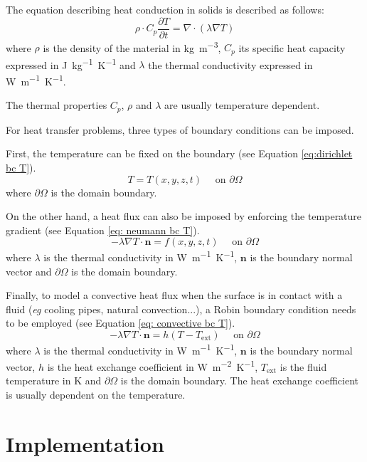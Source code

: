 The equation describing heat conduction in solids is described as follows:
\begin{equation}
    \rho \cdot C_p \frac{\partial T}{\partial t}=\nabla \cdot (\lambda \nabla T)
    \label{eq:heat equation}
\end{equation}
where $\rho$ is the density of the material in \si{kg.m^{-3}}, $C_p$ its specific heat capacity expressed in \si{J.kg^{-1}.K^{-1}} and $\lambda$ the thermal conductivity expressed in \si{W.m^{-1}.K^{-1}}.

The thermal properties $C_p$, $\rho$ and $\lambda$ are usually temperature dependent.

For heat transfer problems, three types of boundary conditions can be imposed.

First, the temperature can be fixed on the boundary (see Equation \ref{eq:dirichlet bc T}).
\begin{equation}
    T = T(x, y, z, t) \quad \text { on } \partial \Omega
    \label{eq:dirichlet bc T}
\end{equation}
where $\partial \Omega$ is the domain boundary.

On the other hand, a heat flux can also be imposed by enforcing the temperature gradient (see Equation \ref{eq: neumann bc T}).
\begin{equation}
    -\lambda \nabla T \cdot \mathbf{n} = f(x, y, z, t) \quad \text { on } \partial \Omega
    \label{eq: neumann bc T}
\end{equation}
where $\lambda$ is the thermal conductivity in \si{W.m^{-1}.K^{-1}}, $\mathbf{n}$ is the boundary normal vector and $\partial \Omega$ is the domain boundary.

Finally, to model a convective heat flux when the surface is in contact with a fluid (\textit{eg} cooling pipes, natural convection...), a Robin boundary condition needs to be employed (see Equation \ref{eq: convective bc T}).
\begin{equation}
    -\lambda \nabla T \cdot \mathbf{n} = h (T - T_\mathrm{ext}) \quad \text { on } \partial \Omega
    \label{eq: convective bc T}
\end{equation}
where $\lambda$ is the thermal conductivity in \si{W.m^{-1}.K^{-1}}, $\mathbf{n}$ is the boundary normal vector, $h$ is the heat exchange coefficient in \si{W.m^{-2}.K^{-1}}, $T_\mathrm{ext}$ is the fluid temperature in \si{K} and $\partial \Omega$ is the domain boundary.
The heat exchange coefficient is usually dependent on the temperature.

\section{Implementation}


